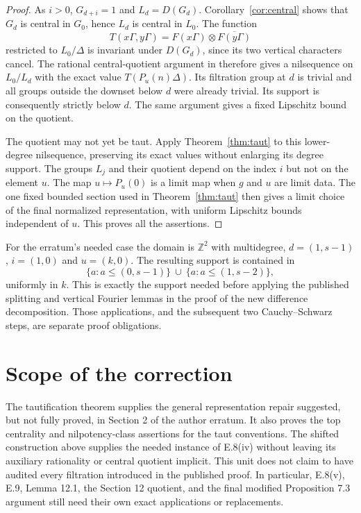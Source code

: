 \documentclass[11pt]{article}
\newcommand{\Z}{\mathbb Z}
\begin{document}
\begin{proof}
As $i>0$, $G_{d+i}=1$ and $L_d=D(G_d)$. Corollary~\ref{cor:central}
shows that $G_d$ is central in $G_0$, hence $L_d$ is central in $L_0$.
The function
\[
 T(x\Gamma,y\Gamma)=F(x\Gamma)\otimes\overline{F(y\Gamma)}
\]
restricted to $L_0/\Delta$ is invariant under $D(G_d)$, since its two
vertical characters cancel. The rational central-quotient argument in
\cite[Sections 2 and 6]{LP13} therefore gives a nilsequence on
$L_0/L_d$ with the exact value $T(P_u(n)\Delta)$. Its filtration group at
$d$ is trivial and all groups outside the downset below $d$ were already
trivial. Its support is consequently strictly below $d$.
The same argument gives a fixed Lipschitz bound on the quotient.

The quotient may not yet be taut. Apply Theorem~\ref{thm:taut} to this
lower-degree nilsequence, preserving its exact values without enlarging its
degree support.
The groups $L_j$ and their quotient depend on the index $i$ but not on the
element $u$. The map $u\mapsto P_u(0)$ is a limit map when $g$ and $u$ are
limit data. The one fixed bounded section used in Theorem~\ref{thm:taut}
then gives a limit choice of the final normalized representation, with
uniform Lipschitz bounds independent of $u$. This proves all the assertions.
\end{proof}

For the erratum's needed case the domain is $\Z^2$ with multidegree,
$d=(1,s-1)$, $i=(1,0)$ and $u=(k,0)$. The resulting support is contained in
\[
 \{a:a\leq(0,s-1)\}\ \cup\ \{a:a\leq(1,s-2)\},
\]
uniformly in $k$. This is exactly the support needed before applying the
published splitting and vertical Fourier lemmas in the proof of the new
difference decomposition. Those applications, and the subsequent two
Cauchy--Schwarz steps, are separate proof obligations.

\section{Scope of the correction}

The tautification theorem supplies the general representation repair
suggested, but not fully proved, in Section 2 of the author erratum.
It also proves the top centrality and nilpotency-class assertions for the
taut conventions. The shifted construction above supplies the needed
instance of E.8(iv) without leaving its auxiliary rationality or central
quotient implicit. This unit does not claim to have audited every filtration
introduced in the published proof. In particular, E.8(v), E.9, Lemma 12.1,
the Section 12 quotient, and the final modified Proposition 7.3 argument
still need their own exact applications or replacements.
\end{document}
